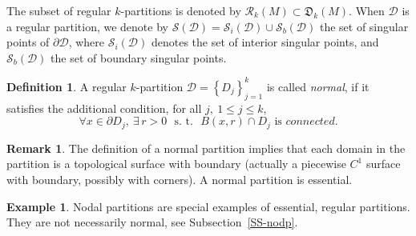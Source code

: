\documentclass[12pt,a4paper]{amsart}
\theoremstyle{plain} %
\theoremstyle{definition}
\newtheorem{definition}[theorem]{Definition}
\newtheorem{example}[theorem]{Example}
\newtheorem{remark}[theorem]{Remark}
\numberwithin{equation}{section}
\numberwithin{figure}{section}
\numberwithin{table}{section}
\newcommand{\cD}{\mathcal{D}}
\newcommand{\cS}{\mathcal{S}}
\newcommand{\mf}{\mathfrak}
\newcommand{\set}[1]{\left\lbrace #1 \right\rbrace}
\newcommand{\bD}{\partial \cD}
\begin{document}
The subset of regular $k$-partitions is denoted by $\mathcal{R}_k(M) \subset \mf{D}_k(M)$. When $\cD$ is a regular partition, we denote by  $\cS(\cD) = \cS_i(\cD) \cup \cS_b(\cD)$ the set of singular points of $\bD$, where $\cS_i(\cD)$ denotes the set of interior singular points, and $\cS_b(\cD)$ the set of boundary singular points.\medskip


\begin{definition}\label{D-parti-nor}
A regular $k$-partition $\cD = \set{D_j}_{j=1}^k$ is called \emph{normal}, if it satisfies the additional condition, for all $j, ~1 \le j \le k$,
%
\begin{equation}\label{E-parti-nor}
\forall x \in \partial D_j, ~\exists \, r >0 \text{~~s. t.~~} B(x,r)\cap D_j \text{~is~} connected.
\end{equation}
\end{definition}%

\begin{remark}\label{R-parti-nor}
The definition of a normal partition implies that each domain in the partition is a topological surface with boundary (actually a piecewise $C^1$ surface with boundary, possibly with corners).  A normal partition is essential.
\end{remark}%


\begin{example}\label{Ex-parti-2}
Nodal partitions are special examples of essential, regular partitions. They are not necessarily normal, see Subsection~\ref{SS-nodp}.
\end{example}%
\end{document}

